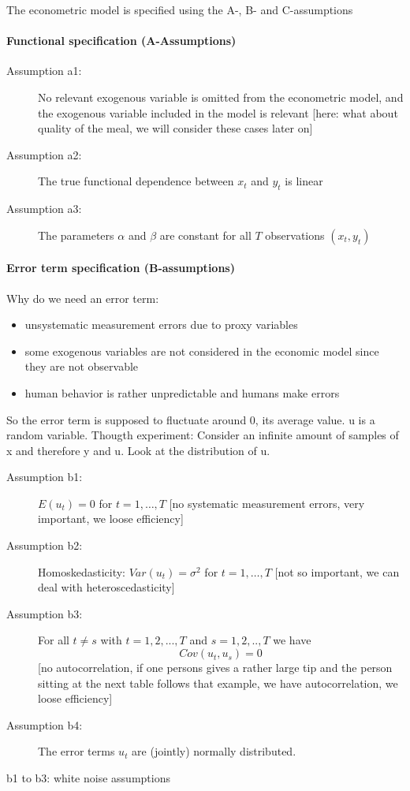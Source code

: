 \documentclass{article}
\begin{document}
 
The econometric model is specified using the A-, B- and  C-assumptions
\paragraph{Functional specification (A-Assumptions)}

\begin{description}
	\item[Assumption a1:] No relevant exogenous variable is omitted from the
	econometric model, and the exogenous variable included in the model is
	relevant [here: what about quality of the meal, we will consider these cases later on]
	
	\item[Assumption a2:] The true functional dependence between $x_{t}$ and $%
	y_{t}$ is linear
	
	\item[Assumption a3:] The parameters $\alpha $ and $\beta $ are constant for
	all $T$ observations $(x_{t},y_{t})$
\end{description}

\paragraph{Error term specification (B-assumptions)}
Why do we need an error term:
\begin{itemize}
	\item unsystematic measurement errors due to proxy variables
	\item some exogenous variables are not considered in the economic model since they are not observable
	\item human behavior is rather unpredictable and humans make errors
\end{itemize}
So the error term is supposed to fluctuate around 0, its average value. u is a random variable. Thougth experiment: Consider an infinite amount of samples of x and therefore y and u. Look at the distribution of u.
\begin{description}
	\item[Assumption b1:] $E(u_{t})=0$ for $t=1,\ldots ,T$ 
	[no systematic measurement errors, very important, we loose efficiency]
	\item[Assumption b2:] Homoskedasticity: $Var(u_{t})=\sigma ^{2}$ for $%
	t=1,\ldots ,T$
	[not so important, we can deal with heteroscedasticity]
	\item[Assumption b3:] For all $t\neq s$ with $t=1,2,...,T$ and $s=1,2,..,T$
	we have%
	\begin{equation*}
	Cov(u_{t},u_{s})=0
	\end{equation*}
	[no autocorrelation, if one persons gives a rather large tip and the person sitting at the next table follows that example, we have autocorrelation, we loose efficiency]
	\item[Assumption b4:] The error terms $u_{t}$ are (jointly) normally distributed.
\end{description}
b1 to b3: white noise assumptions
\end{document}

